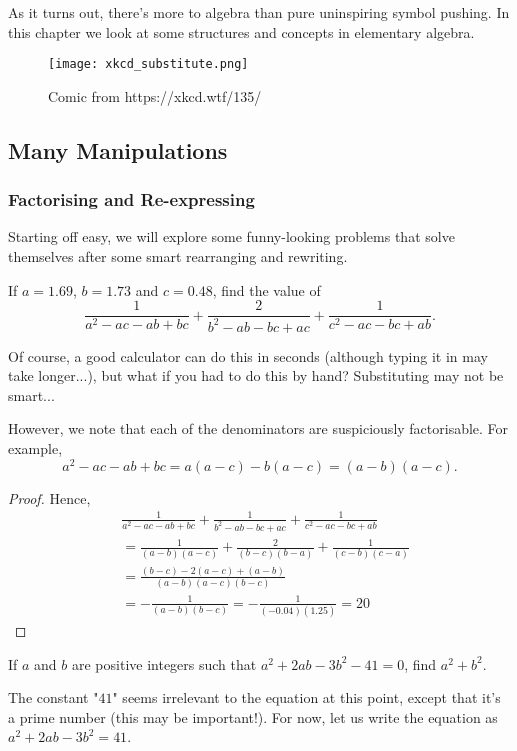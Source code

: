 \documentclass[../jarvis.tex]{subfiles}
\begin{document}
As it turns out, there's more to algebra than pure uninspiring symbol pushing. In this chapter we look at some structures and concepts in elementary algebra.

\begin{figure}[H]
    \centering
    \texttt{[image: xkcd\_substitute.png]}
    \caption{Comic from https://xkcd.wtf/135/}
\end{figure}

\subsection{Many Manipulations \ez}
\subsubsection{Factorising and Re-expressing}
Starting off easy, we will explore some funny-looking problems that solve themselves after some smart rearranging and rewriting.

\begin{example}[2013 SMO(J) P15]
    If $a=1.69$, $b=1.73$ and $c=0.48$, find the value of
    $$\frac{1}{a^2-ac-ab+bc}+\frac{2}{b^2-ab-bc+ac}+\frac{1}{c^2-ac-bc+ab}.$$
\end{example}
Of course, a good calculator can do this in seconds (although typing it in may take longer...), but what if you had to do this by hand? Substituting may not be smart...

However, we note that each of the denominators are suspiciously factorisable. For example,
$$a^2-ac-ab+bc=a(a-c)-b(a-c)=(a-b)(a-c).$$

\begin{proof}
    Hence,
\begin{align*}
    & \frac{1}{a^2-ac-ab+bc}+\frac{1}{b^2-ab-bc+ac}+\frac{1}{c^2-ac-bc+ab}\\
    &=\frac{1}{(a-b)(a-c)}+\frac{2}{(b-c)(b-a)}+\frac{1}{(c-b)(c-a)} \\
    &=\frac{(b-c)-2(a-c)+(a-b)}{(a-b)(a-c)(b-c)} \\
    &=-\frac{1}{(a-b)(b-c)} = -\frac{1}{(-0.04)(1.25)} = \boxed{20}
\end{align*}
\end{proof}


\begin{example}[2013 SMO(J) P32]
    If $a$ and $b$ are positive integers such that $a^2+2ab-3b^2-41=0$, find $a^2+b^2$.
\end{example}
The constant "$41$" seems irrelevant to the equation at this point, except that it's a prime number (this may be important!). For now, let us write the equation as $a^2+2ab-3b^2=41$.
\end{document}
